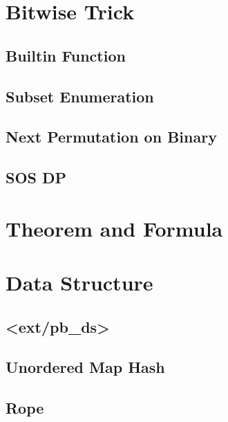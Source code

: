 \documentclass[a4paper,10pt,twocolumn,oneside]{article}
\begin{document}
\section{Bitwise Trick}

\subsection{Builtin Function}


\subsection{Subset Enumeration}


\subsection{Next Permutation on Binary}


\subsection{SOS DP}


\section{Theorem and Formula}


\section{Data Structure}

\subsection{<ext/pb\_ds>}


\subsection{Unordered Map Hash}


\subsection{Rope}

\end{document}
